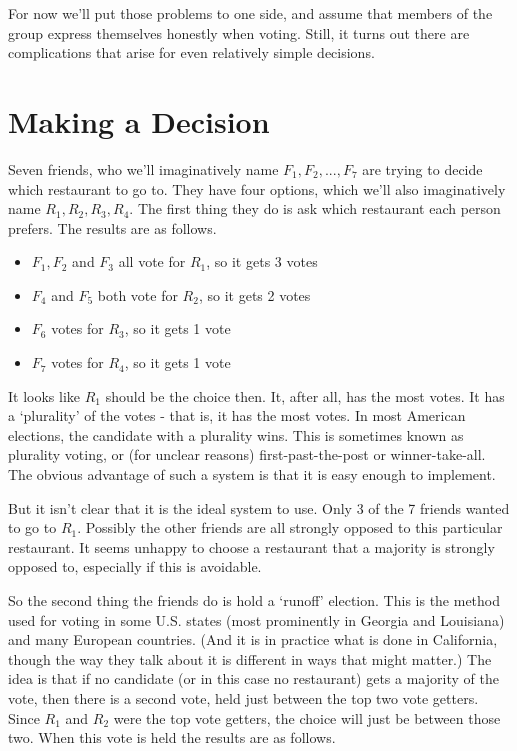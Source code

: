 \documentclass[11pt,]{article}
\providecommand{\tightlist}{%
  \setlength{\itemsep}{0pt}\setlength{\parskip}{0pt}}
\begin{document}
For now we'll put those problems to one side, and assume that members of
the group express themselves honestly when voting. Still, it turns out
there are complications that arise for even relatively simple decisions.

\hypertarget{making-a-decision}{%
\section{Making a Decision}\label{making-a-decision}}

Seven friends, who we'll imaginatively name \(F_1, F_2, ..., F_7\) are
trying to decide which restaurant to go to. They have four options,
which we'll also imaginatively name \(R_1, R_2, R_3, R_4\). The first
thing they do is ask which restaurant each person prefers. The results
are as follows.

\begin{itemize}
\tightlist
\item
  \(F_1, F_2\) and \(F_3\) all vote for \(R_1\), so it gets 3 votes
\item
  \(F_4\) and \(F_5\) both vote for \(R_2\), so it gets 2 votes
\item
  \(F_6\) votes for \(R_3\), so it gets 1 vote
\item
  \(F_7\) votes for \(R_4\), so it gets 1 vote
\end{itemize}

It looks like \(R_1\) should be the choice then. It, after all, has the
most votes. It has a `plurality' of the votes - that is, it has the most
votes. In most American elections, the candidate with a plurality wins.
This is sometimes known as plurality voting, or (for unclear reasons)
first-past-the-post or winner-take-all. The obvious advantage of such a
system is that it is easy enough to implement.

But it isn't clear that it is the ideal system to use. Only 3 of the 7
friends wanted to go to \(R_1\). Possibly the other friends are all
strongly opposed to this particular restaurant. It seems unhappy to
choose a restaurant that a majority is strongly opposed to, especially
if this is avoidable.

So the second thing the friends do is hold a `runoff' election. This is
the method used for voting in some U.S. states (most prominently in
Georgia and Louisiana) and many European countries. (And it is in
practice what is done in California, though the way they talk about it
is different in ways that might matter.) The idea is that if no
candidate (or in this case no restaurant) gets a majority of the vote,
then there is a second vote, held just between the top two vote getters.
Since \(R_1\) and \(R_2\) were the top vote getters, the choice will
just be between those two. When this vote is held the results are as
follows.
\end{document}

